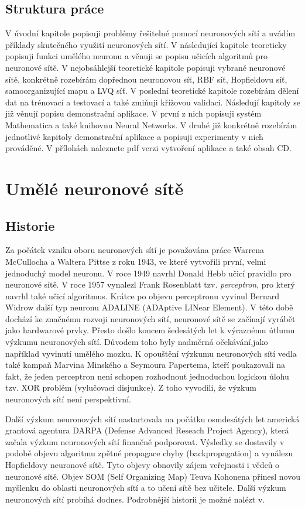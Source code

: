 \documentclass[11pt,twoside,a4paper]{book}
\begin{document}
\section{Struktura práce}
V úvodní kapitole popisuji problémy řešitelné pomocí neuronových sítí a uvádím příklady skutečného využití neuronových sítí. V následující kapitole teoreticky popisuji funkci umělého neuronu a věnuji se popisu učicích algoritmů pro neuronové sítě. V nejobsáhlejší teoretické kapitole popisuji vybrané neuronové sítě, konkrétně rozebírám dopřednou neuronovou síť, RBF síť, Hopfieldovu síť, samoorganizující mapu a LVQ síť. V poslední teoretické kapitole rozebírám dělení dat na trénovací a testovací a také zmiňuji křížovou validaci. Následují kapitoly se již věnují popisu demonstrační aplikace. V první z nich popisuji systém Mathematica a také knihovnu Neural Networks. V druhé již konkrétně rozebírám jednotlivé kapitoly demonstrační aplikace a popisuji experimenty v nich prováděné. V přílohách naleznete pdf verzi vytvoření aplikace a také obsah CD.

\chapter{Umělé neuronové sítě}
\section{Historie}
Za počátek vzniku oboru neuronových sítí je považována práce Warrena McCullocha a Waltera Pittse z roku 1943, ve které vytvořili první, velmi jednoduchý model neuronu. V roce 1949 navrhl Donald Hebb učicí pravidlo pro neuronové sítě. V roce 1957 vynalezl Frank Rosenblatt tzv. \textit{perceptron}, pro který navrhl také učicí algoritmus. Krátce po objevu perceptronu vyvinul Bernard Widrow další typ neuronu ADALINE (ADAptive LINear Element). V této době dochází ke značnému rozvoji neuronových sítí, neuronové sítě se začínají vyrábět jako hardwarové prvky. Přesto došlo koncem šedesátých let k výraznému útlumu výzkumu neuronových sítí. Důvodem toho byly nadměrná očekávání,jako například vyvinutí umělého mozku. K opouštění výzkumu neuronových sítí vedla také kampaň Marvina Minského a Seymoura Papertema, kteří poukazovali na fakt, že jeden perceptron není schopen rozhodnout jednoduchou logickou úlohu tzv. XOR problém (vylučovací disjunkce). Z toho vyvodili, že výzkum neuronových sítí není perspektivní.

Další výzkum neuronových sítí nastartovala na počátku osmdesátých let americká grantová agentura DARPA (Defense Advanced Reseach Project Agency), která začala výzkum neuronových sítí finančně podporovat. Výsledky se dostavily v podobě objevu algoritmu zpětné propagace chyby (backpropagation) a vynálezu Hopfieldovy neuronové sítě. Tyto objevy obnovily zájem veřejnosti i vědců o neuronové sítě. Objev SOM (Self Organizing Map) Teuva Kohonena přinesl novou myšlenku do oblasti neuronových sítí a to učení sítě bez učitele. Další výzkum neuronových sítí probíhá dodnes. Podrobnější historii je možné nalézt v\cite{teoret}.
\end{document}
